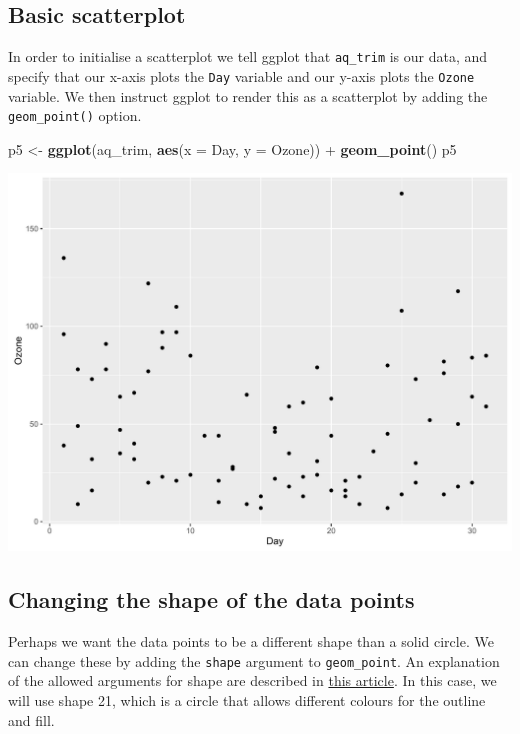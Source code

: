 \documentclass[]{article}
\newenvironment{Shaded}{\begin{snugshade}}{\end{snugshade}}
\newcommand{\KeywordTok}[1]{\textcolor[rgb]{0.13,0.29,0.53}{\textbf{{#1}}}}
\newcommand{\DataTypeTok}[1]{\textcolor[rgb]{0.13,0.29,0.53}{{#1}}}
\newcommand{\StringTok}[1]{\textcolor[rgb]{0.31,0.60,0.02}{{#1}}}
\newcommand{\NormalTok}[1]{{#1}}
\begin{document}
\subsection{Basic scatterplot}\label{basic-scatterplot}

In order to initialise a scatterplot we tell ggplot that
\texttt{aq\_trim} is our data, and specify that our x-axis plots the
\texttt{Day} variable and our y-axis plots the \texttt{Ozone} variable.
We then instruct ggplot to render this as a scatterplot by adding the
\texttt{geom\_point()} option.

\begin{Shaded}
\begin{Highlighting}[]
\NormalTok{p5 <-}\StringTok{ }\KeywordTok{ggplot}\NormalTok{(aq_trim, }\KeywordTok{aes}\NormalTok{(}\DataTypeTok{x =} \NormalTok{Day, }\DataTypeTok{y =} \NormalTok{Ozone)) +}\StringTok{ }
\StringTok{      }\KeywordTok{geom_point}\NormalTok{()}
\NormalTok{p5}
\end{Highlighting}
\end{Shaded}

\begin{center}\includegraphics{0_all_posts_pdf/scatter_1-1} \end{center}

\subsection{Changing the shape of the data
points}\label{changing-the-shape-of-the-data-points}

Perhaps we want the data points to be a different shape than a solid
circle. We can change these by adding the \texttt{shape} argument to
\texttt{geom\_point}. An explanation of the allowed arguments for shape
are described in
\href{http://sape.inf.usi.ch/quick-reference/ggplot2/shape}{this
article}. In this case, we will use shape 21, which is a circle that
allows different colours for the outline and fill.
\end{document}

